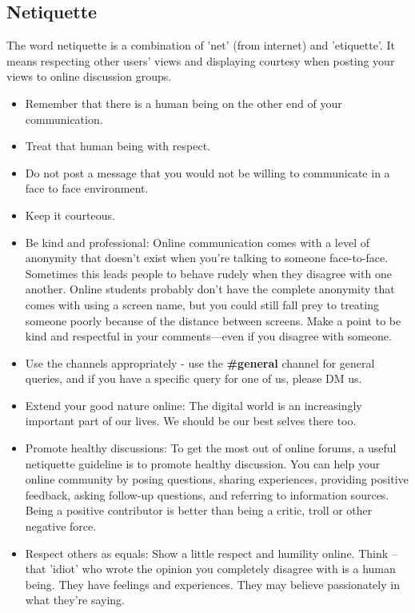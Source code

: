 \documentclass{article}
\begin{document}
  \subsection{Netiquette}
 The word netiquette is a combination of ’net’ (from internet) and ’etiquette’. It means respecting other users’ views and displaying 
courtesy when posting your views to online discussion groups.
 \begin{itemize}
    \item Remember that there is a human being on the other end of your communication.
    \item Treat that human being with respect.
    \item Do not post a message that you would not be willing to communicate in a face to face environment.
    \item Keep it courteous.
    \item Be kind and professional:  Online communication comes with a level of anonymity that doesn’t exist when you’re talking to someone face-to-face. 
    Sometimes this leads people to behave rudely when they disagree with one another. Online students probably don’t have the complete anonymity that comes with using a screen name, but you could still fall prey to treating someone poorly because of the distance between screens. Make a point to be kind and respectful in your comments—even if you disagree with someone.
   \item Use the channels appropriately - use the \textbf{\#general} channel for general queries, 
   and if you have a specific query for one of us, please DM us. 
    \item Extend your good nature online: The digital world is an increasingly important part of our lives. We should be our best selves there too. 
    \item Promote healthy discussions: 
    To get the most out of online forums, a useful netiquette guideline is to promote 
    healthy discussion. You can help your online community by posing questions, 
    sharing experiences, providing positive feedback, asking follow-up questions, 
    and referring to information sources. Being a positive contributor is better 
    than being a critic, troll or other negative force.
    \item  Respect others as equals:
    Show a little respect and humility online. Think – that 'idiot' who wrote the 
    opinion you completely disagree with is a human being. They have feelings 
    and experiences. They may believe passionately in what they're saying. 

\end{itemize}
\end{document}
